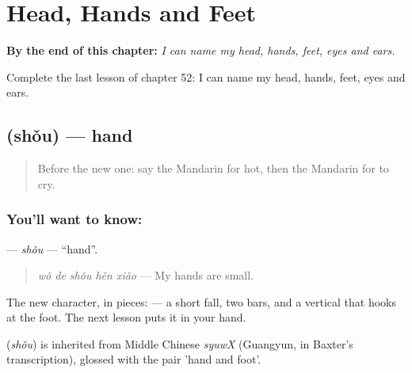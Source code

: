 
\chapter{Head, Hands and Feet}
\label{ch:zh-head-hands-and-feet}

\begin{chapteropening}
\textbf{By the end of this chapter:} \emph{I can name my head, hands, feet, eyes and ears.}

Complete the last lesson of chapter 52: I can name my head, hands, feet, eyes and ears.
\end{chapteropening}

\section[\texorpdfstring{\zh{手} (shǒu)}{手 (shǒu)}]{ (shǒu) — hand}

\label{lesson:ZH-C52-shou}



\begin{quote}
Before the new one: say the Mandarin for hot, then the Mandarin for to cry.
\end{quote}

\subsection*{You'll want to know: }
\textbf{} — \emph{shǒu} — \textquotedblleft{}hand\textquotedblright{}.

\begin{quote}
\textbf{} \emph{wǒ de shǒu hěn xiǎo} — My hands are small.
\end{quote}

The new character, in pieces:  — a short fall, two bars, and a vertical that hooks at the foot. The next lesson puts it in your hand.

\begin{cousinweb}
\textbf{} (\emph{shǒu}) is inherited from Middle Chinese \emph{syuwX} (Guangyun, in Baxter's transcription), glossed with the pair 'hand and foot'.
\end{cousinweb}


